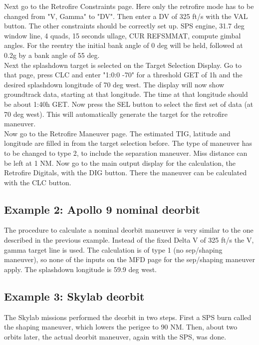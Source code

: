 \documentclass[11pt]{article} %
\begin{document}
Next go to the Retrofire Constraints page. Here only the retrofire mode has to be changed from "V, Gamma" to "DV". Then enter a DV of 325 ft/s with the VAL button. The other constraints should be correctly set up. SPS engine, 31.7 deg window line, 4 quads, 15 seconds ullage, CUR REFSMMAT, compute gimbal angles. For the reentry the initial bank angle of 0 deg will be held, followed at 0.2g by a bank angle of 55 deg.\\

Next the splashdown target is selected on the Target Selection Display. Go to that page, press CLC and enter "1:0:0 -70" for a threshold GET of 1h and the desired splashdown longitude of 70 deg west. The display will now show groundtrack data, starting at that longitude. The time at that longitude should be about 1:40h GET. Now press the SEL button to select the first set of data (at 70 deg west). This will automatically generate the target for the retrofire maneuver.\\

Now go to the Retrofire Maneuver page. The estimated TIG, latitude and longitude are filled in from the target selection before. The type of maneuver has to be changed to type 2, to include the separation maneuver. Miss distance can be left at 1 NM. Now go to the main output display for the calculation, the Retrofire Digitals, with the DIG button. There the maneuver can be calculated with the CLC button.\\

\subsection{Example 2: Apollo 9 nominal deorbit}

The procedure to calculate a nominal deorbit maneuver is very similar to the one described in the previous example. Instead of the fixed Delta V of 325 ft/s the V, gamma target line is used. The calculation is of type 1 (no sep/shaping maneuver), so none of the inputs on the MFD page for the sep/shaping maneuver apply. The splashdown longitude is 59.9 deg west.\\

\subsection{Example 3: Skylab deorbit}

The Skylab missions performed the deorbit in two steps. First a SPS burn called the shaping maneuver, which lowers the perigee to 90 NM. Then, about two orbits later, the actual deorbit maneuver, again with the SPS, was done.\\
\end{document}
